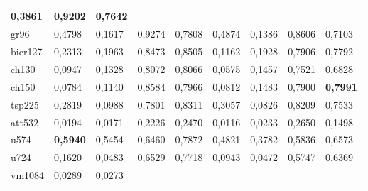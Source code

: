 \begin{table}[ht]
{\begin{tabular}{|l|llll|llll|}
    \multicolumn{1}{l|}{0,3861 } &
    \multicolumn{1}{l|}{\textbf{0,9202} } &
    0,7642  \\ \hline
  gr96 &
    \multicolumn{1}{l|}{0,4798 } &
    \multicolumn{1}{l|}{0,1617 } &
    \multicolumn{1}{l|}{0,9274 } &
    0,7808  &
    \multicolumn{1}{l|}{0,4874 } &
    \multicolumn{1}{l|}{0,1386 } &
    \multicolumn{1}{l|}{0,8606 } &
    0,7103  \\ \hline
  bier127 &
    \multicolumn{1}{l|}{0,2313 } &
    \multicolumn{1}{l|}{0,1963 } &
    \multicolumn{1}{l|}{0,8473 } &
    0,8505  &
    \multicolumn{1}{l|}{0,1162 } &
    \multicolumn{1}{l|}{0,1928 } &
    \multicolumn{1}{l|}{0,7906 } &
    0,7792  \\ \hline
  ch130 &
    \multicolumn{1}{l|}{0,0947 } &
    \multicolumn{1}{l|}{0,1328 } &
    \multicolumn{1}{l|}{0,8072 } &
    0,8066  &
    \multicolumn{1}{l|}{0,0575 } &
    \multicolumn{1}{l|}{0,1457 } &
    \multicolumn{1}{l|}{0,7521 } &
    0,6828  \\ \hline
  ch150 &
    \multicolumn{1}{l|}{0,0784 } &
    \multicolumn{1}{l|}{0,1140 } &
    \multicolumn{1}{l|}{0,8584 } &
    0,7966  &
    \multicolumn{1}{l|}{0,0812 } &
    \multicolumn{1}{l|}{0,1483 } &
    \multicolumn{1}{l|}{0,7900 } &
    \textbf{0,7991 } \\ \hline
  tsp225 &
    \multicolumn{1}{l|}{0,2819 } &
    \multicolumn{1}{l|}{0,0988 } &
    \multicolumn{1}{l|}{0,7801 } &
    0,8311  &
    \multicolumn{1}{l|}{0,3057 } &
    \multicolumn{1}{l|}{0,0826 } &
    \multicolumn{1}{l|}{0,8209 } &
    0,7533  \\ \hline
  att532 &
    \multicolumn{1}{l|}{0,0194 } &
    \multicolumn{1}{l|}{0,0171 } &
    \multicolumn{1}{l|}{0,2226 } &
    0,2470  &
    \multicolumn{1}{l|}{0,0116 } &
    \multicolumn{1}{l|}{0,0233 } &
    \multicolumn{1}{l|}{0,2650 } &
    0,1498  \\ \hline
  u574 &
    \multicolumn{1}{l|}{\textbf{0,5940}} &
    \multicolumn{1}{l|}{0,5454 } &
    \multicolumn{1}{l|}{0,6460 } &
    0,7872  &
    \multicolumn{1}{l|}{0,4821 } &
    \multicolumn{1}{l|}{0,3782 } &
    \multicolumn{1}{l|}{0,5836 } &
    0,6573  \\ \hline
  u724 &
    \multicolumn{1}{l|}{0,1620 } &
    \multicolumn{1}{l|}{0,0483 } &
    \multicolumn{1}{l|}{0,6529 } &
    0,7718  &
    \multicolumn{1}{l|}{0,0943 } &
    \multicolumn{1}{l|}{0,0472 } &
    \multicolumn{1}{l|}{0,5747 } &
    0,6369  \\ \hline
  vm1084 &
    \multicolumn{1}{l|}{0,0289 } &
    \multicolumn{1}{l|}{0,0273 } &

\end{tabular}}
\end{table}
